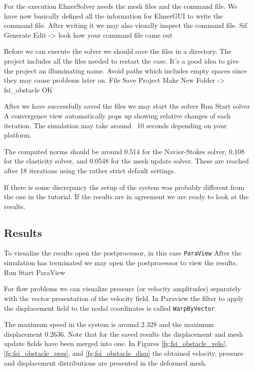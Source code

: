 For the execution 
ElmerSolver needs the mesh files and the command file. We have now basically defined
all the information for ElmerGUI to write the command file. After writing it we may also visually 
inspect the command file.
\ttbegin
Sif 
  Generate
  Edit -> look how your command file came out  
\ttend

Before we can execute the solver we should save the files in a directory. The project includes
all the files needed to restart the case. It's a good idea to give the project an illuminating name.
Avoid paths which includes empty spaces since they may cause problems later on. 
\ttbegin
File 
  Save Project
    Make New Folder -> fsi_obstacle
    OK
\ttend

After we have successfully saved the files we may start the solver
\ttbegin
Run
  Start solver
\ttend
A convergence view automatically pops up showing relative changes of each iteration.
The simulation may take around ~10 seconds depending on your platform. 

The computed norms should be around 0.514 for the Navier-Stokes solver, 0.108 for the elasticity solver,
and 0.0548 for the mesh update solver. These are reached after 18 iterations using the rather strict default settings.

If there is some discrepancy the setup of the system
was probably different from the one in the tutorial.
If the results are in agreement we are ready to look at the results.

\subsection*{Results}

To visualize the results open the postprocessor, in this case \texttt{ParaView}
After the simulation has terminated we may open the postprocessor to view the results.
\ttbegin
Run
  Start ParaView
\ttend

For flow problems we can visualize pressure (or velocity amplitudes) separately with the vector presentation
of the velocity field. In Paraview the filter to apply the displacement field to the nodal coordinates is
called \texttt{WarpByVector}.

The maximum speed in the system is around 2.328 and the maximum displacement 0.2636. Note that 
for the saved results the displacement and mesh update fields have been merged into one. 
In Figures \ref{fg:fsi_obstacle_velo}, \ref{fg:fsi_obstacle_pres}, and
\ref{fg:fsi_obstacle_disp}
the obtained velocity, pressure and displacement 
distributions are presented in the deformed mesh.
 
